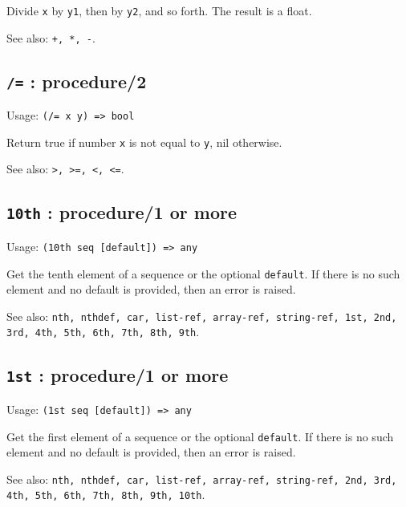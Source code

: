 \documentclass[
]{article}
\newcommand{\passthrough}[1]{#1}
\begin{document}
Divide \passthrough{\lstinline!x!} by \passthrough{\lstinline!y1!}, then
by \passthrough{\lstinline!y2!}, and so forth. The result is a float.

See also: \passthrough{\lstinline!+, *, -!}.

\hypertarget{procedure2-8}{%
\subsection{\texorpdfstring{\texttt{/=} :
procedure/2}{/= : procedure/2}}\label{procedure2-8}}

Usage: \passthrough{\lstinline!(/= x y) => bool!}

Return true if number \passthrough{\lstinline!x!} is not equal to
\passthrough{\lstinline!y!}, nil otherwise.

See also: \passthrough{\lstinline!>, >=, <, <=!}.

\hypertarget{th-procedure1-or-more-7}{%
\subsection{\texorpdfstring{\texttt{10th} : procedure/1 or
more}{10th : procedure/1 or more}}\label{th-procedure1-or-more-7}}

Usage: \passthrough{\lstinline!(10th seq [default]) => any!}

Get the tenth element of a sequence or the optional
\passthrough{\lstinline!default!}. If there is no such element and no
default is provided, then an error is raised.

See also:
\passthrough{\lstinline!nth, nthdef, car, list-ref, array-ref, string-ref, 1st, 2nd, 3rd, 4th, 5th, 6th, 7th, 8th, 9th!}.

\hypertarget{st-procedure1-or-more-1}{%
\subsection{\texorpdfstring{\texttt{1st} : procedure/1 or
more}{1st : procedure/1 or more}}\label{st-procedure1-or-more-1}}

Usage: \passthrough{\lstinline!(1st seq [default]) => any!}

Get the first element of a sequence or the optional
\passthrough{\lstinline!default!}. If there is no such element and no
default is provided, then an error is raised.

See also:
\passthrough{\lstinline!nth, nthdef, car, list-ref, array-ref, string-ref, 2nd, 3rd, 4th, 5th, 6th, 7th, 8th, 9th, 10th!}.
\end{document}

